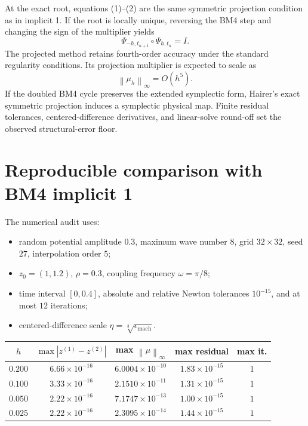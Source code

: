 \documentclass[11pt,a4paper]{article}
\newcommand{\Id}{I}
\newcommand{\norm}[1]{\left\lVert #1\right\rVert}
\begin{document}
At the exact root, equations (1)--(2) are the same symmetric projection
condition as in implicit 1.  If the root is locally unique, reversing the BM4
step and changing the sign of the multiplier yields
\[
 \Psi_{-h,t_{n+1}}\circ\Psi_{h,t_n}=\Id.
\]
The projected method retains fourth-order accuracy under the standard regularity
conditions.  Its projection multiplier is expected to scale as
\[
 \norm{\mu_h}_\infty=O(h^5).
\]
If the doubled BM4 cycle preserves the extended symplectic form, Hairer's exact
symmetric projection induces a symplectic physical map.  Finite residual
tolerances, centered-difference derivatives, and linear-solve round-off set the
observed structural-error floor.

\section{Reproducible comparison with BM4 implicit 1}

The numerical audit uses:
\begin{itemize}
 \item random potential amplitude $0.3$, maximum wave number $8$, grid
       $32\times32$, seed $27$, interpolation order $5$;
 \item $z_0=(1,1.2)$, $\rho=0.3$, coupling frequency $\omega=\pi/8$;
 \item time interval $[0,0.4]$, absolute and relative Newton tolerances
       $10^{-15}$, and at most $12$ iterations;
 \item centered-difference scale $\eta=\sqrt[3]{\epsilon_{\mathrm{mach}}}$.
\end{itemize}

\begin{center}
\small
\begin{tabular}{@{}ccccc@{}}
\toprule
$h$ & $\max|z^{(1)}-z^{(2)}|$ & max $\norm{\mu}_\infty$ & max residual & max it.\\
\midrule
$0.200$ & $6.66\times10^{-16}$ & $6.0004\times10^{-10}$ & $1.83\times10^{-15}$ & $1$\\
$0.100$ & $3.33\times10^{-16}$ & $2.1510\times10^{-11}$ & $1.31\times10^{-15}$ & $1$\\
$0.050$ & $2.22\times10^{-16}$ & $7.1747\times10^{-13}$ & $1.00\times10^{-15}$ & $1$\\
$0.025$ & $2.22\times10^{-16}$ & $2.3095\times10^{-14}$ & $1.44\times10^{-15}$ & $1$\\
\bottomrule
\end{tabular}
\end{center}
\end{document}

